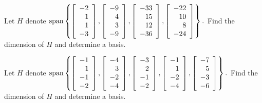 \begin{enumialphparenastyle}
\begin{ex} Let $H$ denote $\mbox{span}\left\{ \left[ 
\begin{array}{r}
-2 \\ 
1 \\ 
1 \\ 
-3
\end{array}
\right] ,\left[ 
\begin{array}{r}
-9 \\ 
4 \\ 
3 \\ 
-9
\end{array}
\right] ,\left[ 
\begin{array}{r}
-33 \\ 
15 \\ 
12 \\ 
-36
\end{array}
\right] ,\left[ 
\begin{array}{r}
-22 \\ 
10 \\ 
8 \\ 
-24
\end{array}
\right] \right\} .$ Find the dimension of $H$ and determine a basis.
\end{ex}

\begin{ex} Let $H$ denote $\mbox{span}\left\{ \left[ 
\begin{array}{r}
-1 \\ 
1 \\ 
-1 \\ 
-2
\end{array}
\right] ,\left[ 
\begin{array}{r}
-4 \\ 
3 \\ 
-2 \\ 
-4
\end{array}
\right] ,\left[ 
\begin{array}{r}
-3 \\ 
2 \\ 
-1 \\ 
-2
\end{array}
\right] ,\left[ 
\begin{array}{r}
-1 \\ 
1 \\ 
-2 \\ 
-4
\end{array}
\right] ,\left[ 
\begin{array}{r}
-7 \\ 
5 \\ 
-3 \\ 
-6
\end{array}
\right] \right\} .$ Find the dimension of $H$ and determine a basis. \vspace{%
1mm}
\end{ex}


\end{enumialphparenastyle}
